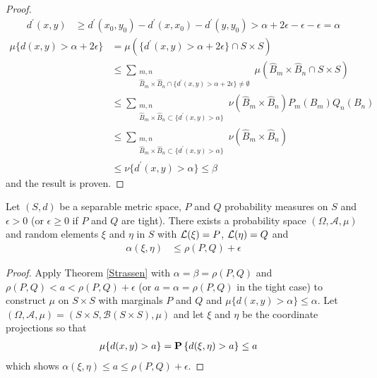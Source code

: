 \begin{proof}
\begin{align*}
d^\prime(x,y) &\geq d^\prime(x_0, y_0) - d^\prime(x,x_0) - d^\prime(y,y_0) > \alpha + 2\epsilon - \epsilon - \epsilon = \alpha
\end{align*}
\begin{align*}
\mu \lbrace d(x,y) > \alpha + 2 \epsilon \rbrace &= \mu \left(\lbrace d^\prime(x,y) > \alpha + 2 \epsilon \rbrace \cap S \times S \right) \\
&\leq \sum_{\substack{m,n\\ \hat{B}_m \times \hat{B}_n \cap \lbrace d^\prime(x,y) > \alpha + 2 \epsilon \rbrace \neq \emptyset}} \mu(\hat{B}_m \times \hat{B}_n \cap S \times S) \\
&\leq \sum_{\substack{m,n\\ \hat{B}_m \times \hat{B}_n \subset \lbrace d^\prime(x,y) > \alpha \rbrace}} \nu(\hat{B}_m \times \hat{B}_n) P_m(B_m) Q_n(B_n) \\
&\leq \sum_{\substack{m,n\\ \hat{B}_m \times \hat{B}_n \subset \lbrace d^\prime(x,y) > \alpha \rbrace}} \nu(\hat{B}_m \times \hat{B}_n) \\
&\leq \nu \lbrace d^\prime(x,y) > \alpha \rbrace \leq \beta
\end{align*}
and the result is proven.
\end{proof}

\begin{cor}\label{StrassenKyFanProhorovBound}Let $(S,d)$ be a separable metric space, $P$ and $Q$ probability measures on $S$ and $\epsilon > 0$ (or $\epsilon \geq 0$ if $P$ and $Q$ are tight).  There exists a probability space $(\Omega, \mathcal{A}, \mu)$ and random elements $\xi$ and $\eta$ in $S$ with $\mathcal{L}(\xi) = P$, $\mathcal{L}(\eta)=Q$ and
\begin{align*}
\alpha(\xi, \eta) &\leq \rho(P,Q)  + \epsilon
\end{align*}
\end{cor}
\begin{proof}
Apply Theorem \ref{Strassen} with $\alpha=\beta=\rho(P,Q)$ and $\rho(P,Q) < a < \rho(P,Q) + \epsilon$ (or $a=\alpha=\rho(P,Q)$ in the tight case) to construct $\mu$ on $S \times S$ with marginals $P$ and $Q$ and $\mu \lbrace d(x,y) > \alpha \rbrace \leq \alpha$.  Let $(\Omega, \mathcal{A}, \mu) = (S \times S, \mathcal{B}(S \times S), \mu)$ and let $\xi$ and $\eta$ be the coordinate projections so that 
\begin{align*}
\mu \lbrace d(x,y) > a \rbrace &= \textbf{P}\left \{d(\xi, \eta) > a \right \} \leq a
\end{align*}
which shows $\alpha(\xi, \eta) \leq a \leq \rho(P,Q)  + \epsilon$.
\end{proof}


